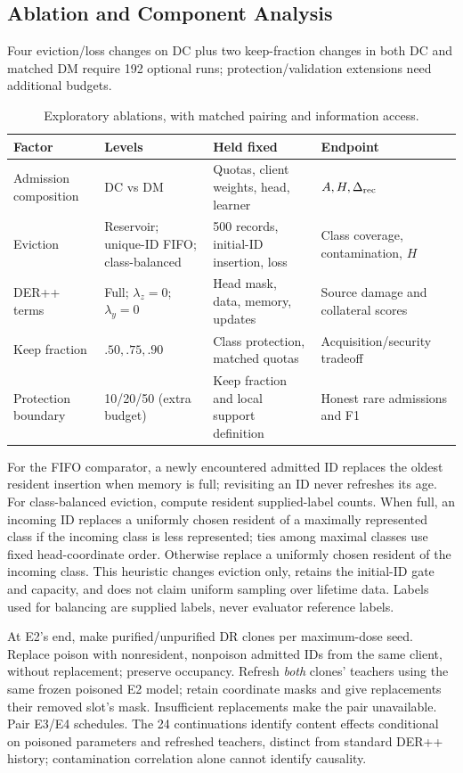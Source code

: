 \documentclass[10pt,a4paper]{article}
\begin{document}
\subsection{Ablation and Component Analysis}
Four eviction/loss changes on DC plus two keep-fraction changes in both DC and matched DM require 192 optional runs; protection/validation extensions need additional budgets.
\begin{table}[htbp]
\centering\footnotesize
\caption{Exploratory ablations, with matched pairing and information access.}
\label{tab:ablations}
\begin{tabularx}{\linewidth}{L{2.1cm}Y Y Y}
\toprule
Factor & Levels & Held fixed & Endpoint\\
\midrule
Admission composition & DC vs DM & Quotas, client weights, head, learner & $A,H,\Delta_{\rm rec}$\\
Eviction & Reservoir; unique-ID FIFO; class-balanced & 500 records, initial-ID insertion, loss & Class coverage, contamination, $H$\\
DER++ terms & Full; $\lambda_z=0$; $\lambda_y=0$ & Head mask, data, memory, updates & Source damage and collateral scores\\
Keep fraction & $.50,.75,.90$ & Class protection, matched quotas & Acquisition/security tradeoff\\
Protection boundary & 10/20/50 (extra budget) & Keep fraction and local support definition & Honest rare admissions and F1\\
\bottomrule
\end{tabularx}
\end{table}
For the FIFO comparator, a newly encountered admitted ID replaces the oldest resident insertion when memory is full; revisiting an ID never refreshes its age. For class-balanced eviction, compute resident supplied-label counts. When full, an incoming ID replaces a uniformly chosen resident of a maximally represented class if the incoming class is less represented; ties among maximal classes use fixed head-coordinate order. Otherwise replace a uniformly chosen resident of the incoming class. This heuristic changes eviction only, retains the initial-ID gate and capacity, and does not claim uniform sampling over lifetime data. Labels used for balancing are supplied labels, never evaluator reference labels.

At E2's end, make purified/unpurified DR clones per maximum-dose seed. Replace poison with nonresident, nonpoison admitted IDs from the same client, without replacement; preserve occupancy. Refresh \emph{both} clones' teachers using the same frozen poisoned E2 model; retain coordinate masks and give replacements their removed slot's mask. Insufficient replacements make the pair unavailable. Pair E3/E4 schedules. The 24 continuations identify content effects conditional on poisoned parameters and refreshed teachers, distinct from standard DER++ history; contamination correlation alone cannot identify causality.
\end{document}
